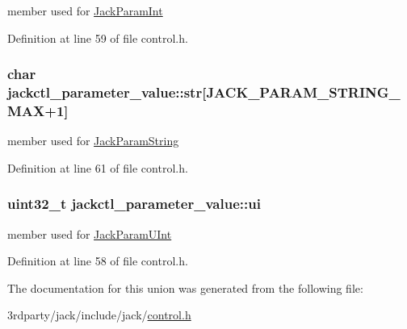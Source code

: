 member used for \hyperlink{control_8h_ac71832cf5445a694a178d15345d67840a257077c62b40f8c7c6b253c21fcaa5e6}{\-Jack\-Param\-Int} 



\-Definition at line 59 of file control.\-h.

\hypertarget{unionjackctl__parameter__value_a3d696c7c7ceea1cdca2a215b4e01dcbb}{
\subsubsection[{str}]{\setlength{\rightskip}{0pt plus 5cm}char {\bf jackctl\-\_\-parameter\-\_\-value\-::str}\mbox{[}{\bf \-J\-A\-C\-K\-\_\-\-P\-A\-R\-A\-M\-\_\-\-S\-T\-R\-I\-N\-G\-\_\-\-M\-A\-X}+1\mbox{]}}}\label{dc/d32/unionjackctl__parameter__value_a3d696c7c7ceea1cdca2a215b4e01dcbb}


member used for \hyperlink{control_8h_ac71832cf5445a694a178d15345d67840aabd8d7557b32d28d8bc7c22449a74b0b}{\-Jack\-Param\-String} 



\-Definition at line 61 of file control.\-h.

\hypertarget{unionjackctl__parameter__value_aff0227f8e7a6959b93886febe576d0be}{
\subsubsection[{ui}]{\setlength{\rightskip}{0pt plus 5cm}uint32\-\_\-t {\bf jackctl\-\_\-parameter\-\_\-value\-::ui}}}\label{dc/d32/unionjackctl__parameter__value_aff0227f8e7a6959b93886febe576d0be}


member used for \hyperlink{control_8h_ac71832cf5445a694a178d15345d67840a574c962072518406c2aebf6b3d6ddc71}{\-Jack\-Param\-U\-Int} 



\-Definition at line 58 of file control.\-h.



\-The documentation for this union was generated from the following file\-:\begin{DoxyCompactItemize}
\item 
3rdparty/jack/include/jack/\hyperlink{control_8h}{control.\-h}\end{DoxyCompactItemize}
